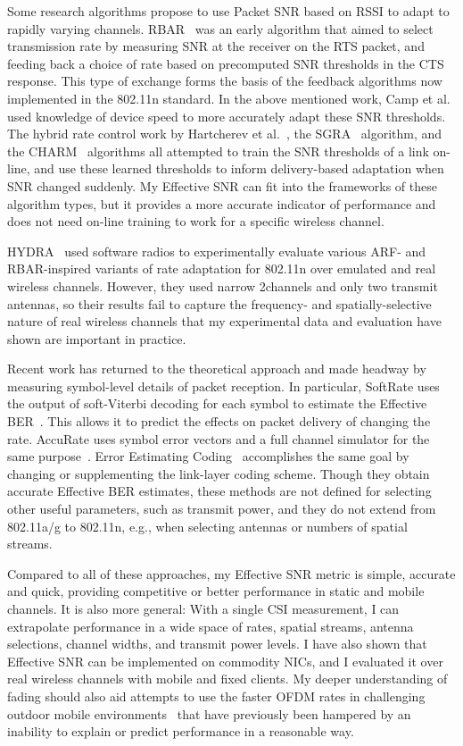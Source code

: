 Some research algorithms propose to use Packet SNR based on RSSI to adapt to rapidly varying channels. RBAR~\cite{Holland_RBAR} was an early algorithm that aimed to select transmission rate by measuring SNR at the receiver on the RTS packet, and feeding back a choice of rate based on precomputed SNR thresholds in the CTS response. This type of exchange forms the basis of the feedback algorithms now implemented in the 802.11n standard. In the above mentioned work, Camp et al. used knowledge of device speed to more accurately adapt these SNR thresholds. The hybrid rate control work by Hartcherev et al.~\cite{Haratcherev_Hybrid}, the SGRA~\cite{Zhang_SNRguided} algorithm, and the CHARM~\cite{Judd_CHARM} algorithms all attempted to train the SNR thresholds of a link on-line, and use these learned thresholds to inform delivery-based adaptation when SNR changed suddenly. My Effective SNR can fit into the frameworks of these algorithm types, but it provides a more accurate indicator of performance and does not need on-line training to work for a specific wireless channel.

HYDRA~\cite{Kim_Hydra} used software radios to experimentally evaluate various ARF- and RBAR-inspired variants of rate adaptation for 802.11n over emulated and real wireless channels. However, they used narrow 2\MHz channels and only two transmit antennas, so their results fail to capture the frequency- and spatially-selective nature of real wireless channels that my experimental data and evaluation have shown are important in practice.

Recent work has returned to the theoretical approach and made headway by measuring symbol-level details of packet reception. In particular, SoftRate uses the output of soft-Viterbi decoding for each symbol to estimate the Effective BER~\cite{Vutukuru_SoftRate}. This allows it to predict the effects on packet delivery of changing the rate. AccuRate uses symbol error vectors and a full channel simulator for the same purpose~\cite{Sen_AccuRate}. Error Estimating Coding~\cite{Chen_EEC} accomplishes the same goal by changing or supplementing the link-layer coding scheme. Though they obtain accurate Effective BER estimates, these methods are not defined for selecting other useful parameters, such as transmit power, and they do not extend from 802.11a/g to 802.11n, e.g., when selecting antennas or numbers of spatial streams.

Compared to all of these approaches, my Effective SNR metric is simple, accurate and quick, providing competitive or better performance in static and mobile channels. It is also more general: With a single CSI measurement, I can extrapolate performance in a wide space of rates, spatial streams, antenna selections, channel widths, and transmit power levels. I have also shown that Effective SNR can be implemented on commodity NICs, and I evaluated it over real wireless channels with mobile and fixed clients. My deeper understanding of fading should also aid attempts to use the faster OFDM rates in challenging outdoor mobile environments~\cite{Eriksson_Cabernet} that have previously been hampered by an inability to explain or predict performance in a reasonable way.

